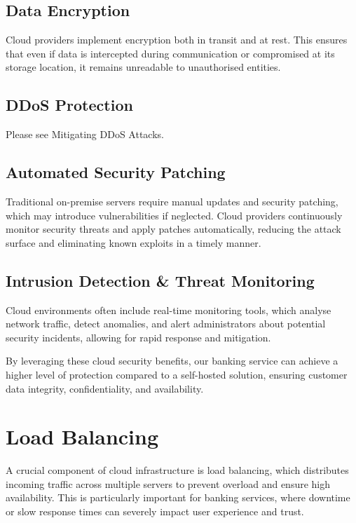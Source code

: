 \documentclass{article}
\begin{document}
	\subsection{Data Encryption}
	\par Cloud providers implement encryption both in transit and at rest. This ensures that even if data is intercepted during communication or compromised at its storage location, it remains unreadable to unauthorised entities.
	\subsection{DDoS Protection}
	\par Please see Mitigating DDoS Attacks.
	\subsection{Automated Security Patching}
	\par Traditional on-premise servers require manual updates and security patching, which may introduce vulnerabilities if neglected. Cloud providers continuously monitor security threats and apply patches automatically, reducing the attack surface and eliminating known exploits in a timely manner.
	\subsection{Intrusion Detection \& Threat Monitoring}
	\par Cloud environments often include real-time monitoring tools, which analyse network traffic, detect anomalies, and alert administrators about potential security incidents, allowing for rapid response and mitigation.
	\par By leveraging these cloud security benefits, our banking service can achieve a higher level of protection compared to a self-hosted solution, ensuring customer data integrity, confidentiality, and availability.
	\section{Load Balancing}
	\par A crucial component of cloud infrastructure is load balancing, which distributes incoming traffic across multiple servers to prevent overload and ensure high availability. This is particularly important for banking services, where downtime or slow response times can severely impact user experience and trust.
\end{document}
